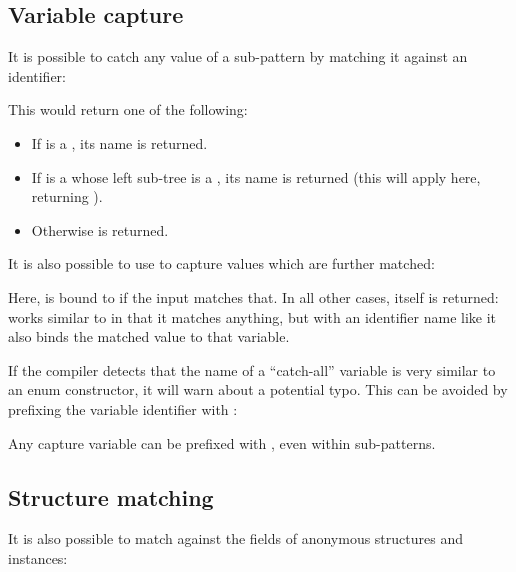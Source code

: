 \subsection{Variable capture}
\label{lf-pattern-matching-variable-capture}

It is possible to catch any value of a sub-pattern by matching it against an identifier:


This would return one of the following:

\begin{itemize}
	\item If  is a , its name is returned.
	\item If  is a  whose left sub-tree is a , its name is returned (this will apply here, returning ).
	\item Otherwise  is returned.
\end{itemize}

It is also possible to use \expr{=} to capture values which are further matched:


Here,  is bound to  if the input matches that. In all other cases,  itself is returned:  works similar to  in that it matches anything, but with an identifier name like  it also binds the matched value to that variable.


If the compiler detects that the name of a ``catch-all'' variable is very similar to an enum constructor, it will warn about a potential typo. This can be avoided by prefixing the variable identifier with :


Any capture variable can be prefixed with , even within sub-patterns.

\subsection{Structure matching}
\label{lf-pattern-matching-structure}

It is also possible to match against the fields of anonymous structures and instances:

